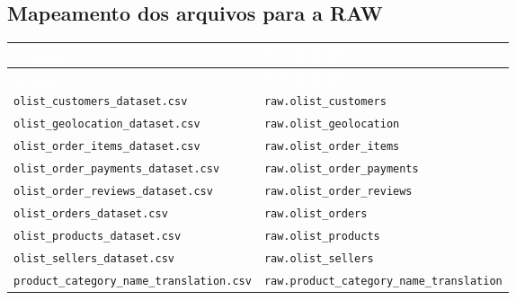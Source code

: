 \documentclass[12pt,a4paper]{article}
\begin{document}
	\subsection{Mapeamento dos arquivos para a RAW}
	
	{\small
		\renewcommand{\arraystretch}{1.25}
		
		\begin{longtable}{
				|>{\raggedright\arraybackslash}p{7.5cm}|
				>{\raggedright\arraybackslash}p{7.5cm}|
			}
			
			\hline
			
			\rowcolor{AzulCorporativo}
			\textcolor{white}{\textbf{Arquivo}}
			&
			\textcolor{white}{\textbf{Tabela RAW}}
			\\ \hline
			
			\endfirsthead
			
			\hline
			\rowcolor{AzulCorporativo}
			\textcolor{white}{\textbf{Arquivo}}
			&
			\textcolor{white}{\textbf{Tabela RAW}}
			\\ \hline
			
			\endhead
			
			\texttt{olist\_customers\_dataset.csv}
			&
			\texttt{raw.olist\_customers}
			\\ \hline
			
			\texttt{olist\_geolocation\_dataset.csv}
			&
			\texttt{raw.olist\_geolocation}
			\\ \hline
			
			\texttt{olist\_order\_items\_dataset.csv}
			&
			\texttt{raw.olist\_order\_items}
			\\ \hline
			
			\texttt{olist\_order\_payments\_dataset.csv}
			&
			\texttt{raw.olist\_order\_payments}
			\\ \hline
			
			\texttt{olist\_order\_reviews\_dataset.csv}
			&
			\texttt{raw.olist\_order\_reviews}
			\\ \hline
			
			\texttt{olist\_orders\_dataset.csv}
			&
			\texttt{raw.olist\_orders}
			\\ \hline
			
			\texttt{olist\_products\_dataset.csv}
			&
			\texttt{raw.olist\_products}
			\\ \hline
			
			\texttt{olist\_sellers\_dataset.csv}
			&
			\texttt{raw.olist\_sellers}
			\\ \hline
			
			\texttt{product\_category\_name\_translation.csv}
			&
			\texttt{raw.product\_category\_name\_translation}
			\\ \hline
			
		\end{longtable}
	}
	
\end{document}
